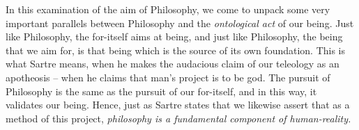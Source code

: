 In this examination of the aim of Philosophy, we come to unpack some very important parallels between Philosophy and the \emph{ontological act} of our being. Just like Philosophy, the for-itself aims at being, and just like Philosophy, the being that we aim for, is that being which is the source of its own foundation. This is what Sartre means, when he makes the audacious claim of our teleology as an apotheosis -- when he claims that man's project is to be god.  The pursuit of Philosophy is the same as the pursuit of our for-itself, and in this way, it validates our being. Hence, just as Sartre states that  we likewise assert that as a method of this project, \emph{philosophy is a fundamental component of human-reality.}

